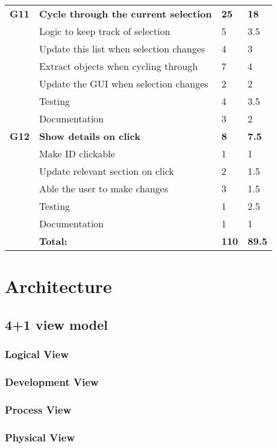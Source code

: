 \begin{table}
\begin{tabular}{ l p{8cm} l l }
 \bf{G11}	  &\bf{Cycle through the current selection}	&\bf{25}		&\bf{18}		     \\
		  &Logic to keep track of selection			&5			&3.5		\\
		  &Update this list when selection changes	&4			&3		\\
		  &Extract objects when cycling through		&7			&4		\\
		  &Update the GUI when selection changes	&2			&2		\\
		  &Testing							&4			&3.5		\\
		  &Documentation						&3			&2		\\

\bf{G12}	  &\bf{Show details on click}			&\bf{8}		&\bf{7.5}		     \\
		  &Make ID clickable					&1			&1		\\
		  &Update relevant section on click		&2			&1.5		\\
		  &Able the user to make changes		&3			&1.5		\\
		  &Testing						&1			&2.5		\\
		  &Documentation					&1			&1		\\
\hline 
		  &\bf{Total:}						&\bf{110}		&\bf{89.5}		\\
\hline
\end{tabular}
\label{table:sp2usrstories}
\end{table}


\section{Architecture}
\subsection{4+1 view model}
\subsubsection{Logical View}
\subsubsection{Development View}
\subsubsection{Process View}
\subsubsection{Physical View}

